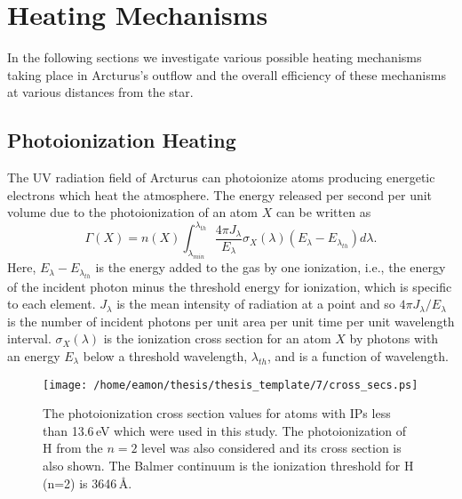 \section{Heating Mechanisms}\label{sec:7.4}
In the following sections we investigate various possible heating mechanisms taking place in Arcturus's outflow and the  overall efficiency of these mechanisms at various distances from the star. 

\subsection{Photoionization Heating}\label{sec:7.4.1}
The UV radiation field of Arcturus can photoionize atoms producing energetic electrons which heat the atmosphere. The energy released per second per unit volume due to the photoionization of an atom $X$ can be written as
\begin{equation}\label{eq:7.20}
\Gamma (X) = n(X)\int ^{\lambda _{th}}_{\lambda _{min}}\frac{4\pi J_{\lambda}}{E _{\lambda}}\sigma _{X}(\lambda)(E_{\lambda} - E_{\lambda _{th}})d\lambda .
\end{equation}
Here, $E_{\lambda} - E_{\lambda _{th}}$ is the energy added to the gas by one ionization, i.e., the energy of the incident photon minus the threshold energy for ionization, which is specific to each element. $J_{\lambda}$ is the 
mean intensity of radiation at a point and so $4\pi J_{\lambda}/E _{\lambda}$ is the number of incident photons per unit area per unit time per unit wavelength interval. $\sigma _{X}(\lambda)$ is the ionization cross section for an atom $X$ by photons with an energy $E_{\lambda}$ below a threshold wavelength, $\lambda _{th}$, and is a function of wavelength.

\begin{figure}[!ht]
\centering 
         \texttt{[image: /home/eamon/thesis/thesis\_template/7/cross\_secs.ps]}
\caption[Photoionization cross section values]{The photoionization cross section values for atoms with IPs less than 13.6\,eV which were used in this study. The photoionization of H from the $n=2$ level was also considered and its cross section is also shown. The Balmer continuum is the ionization threshold for H\,(n=2) is 3646\,\AA .}
\label{fig:7.3}
\end{figure}


